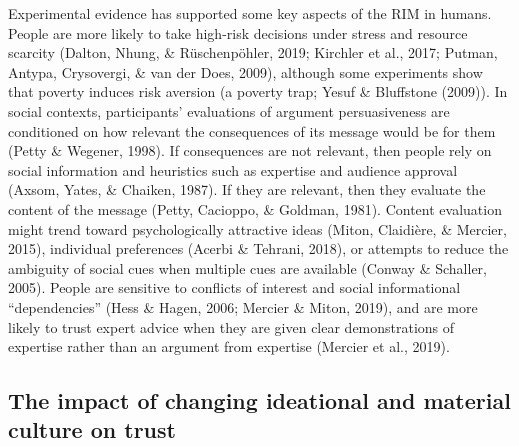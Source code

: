 \documentclass[
  11pt,
]{article}
\begin{document}
Experimental evidence has supported some key aspects of the RIM in
humans. People are more likely to take high-risk decisions under stress
and resource scarcity (Dalton, Nhung, \& Rüschenpöhler, 2019; Kirchler
et al., 2017; Putman, Antypa, Crysovergi, \& van der Does, 2009),
although some experiments show that poverty induces risk aversion (a
poverty trap; Yesuf \& Bluffstone (2009)). In social contexts,
participants' evaluations of argument persuasiveness are conditioned on
how relevant the consequences of its message would be for them (Petty \&
Wegener, 1998). If consequences are not relevant, then people rely on
social information and heuristics such as expertise and audience
approval (Axsom, Yates, \& Chaiken, 1987). If they are relevant, then
they evaluate the content of the message (Petty, Cacioppo, \& Goldman,
1981). Content evaluation might trend toward psychologically attractive
ideas (Miton, Claidière, \& Mercier, 2015), individual preferences
(Acerbi \& Tehrani, 2018), or attempts to reduce the ambiguity of social
cues when multiple cues are available (Conway \& Schaller, 2005). People
are sensitive to conflicts of interest and social informational
``dependencies'' (Hess \& Hagen, 2006; Mercier \& Miton, 2019), and are
more likely to trust expert advice when they are given clear
demonstrations of expertise rather than an argument from expertise
(Mercier et al., 2019).

\hypertarget{the-impact-of-changing-ideational-and-material-culture-on-trust}{%
\subsection{The impact of changing ideational and material culture on
trust}\label{the-impact-of-changing-ideational-and-material-culture-on-trust}}
\end{document}
